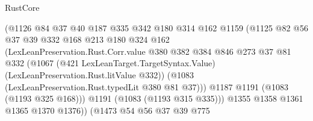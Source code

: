 \begin{lexlean}{RustCore}
\begin{coremodule}
{\begin{coremodule}
{{{{{                                      (@1126
                                        @84
                                        @37
                                        @40
                                        @187
                                        @335
                                        @342
                                        @180
                                        @314
                                        @162
                                        @1159
                                        (@1125
                                          @82
                                          @56
                                          @37
                                          @39
                                          @332
                                          @168
                                          @213
                                          @180
                                          @324
                                          @162
                                          (LexLeanPreservation.Rust.Corr.value
                                            @380
                                            @382
                                            @384
                                            @846
                                            @273
                                            @37
                                            @81
                                            @332
                                            (@1067
                                              (@421 LexLeanTarget.TargetSyntax.Value)
                                              (LexLeanPreservation.Rust.litValue @332))
                                            (@1083
                                              (LexLeanPreservation.Rust.typedLit @380 @81 @37)))
                                          @1187
                                          @1191
                                          (@1083 (@1193 @325 @168)))
                                        @1191
                                        (@1083 (@1193 @315 @335)))
                                      @1355
                                      @1358
                                      @1361
                                      @1365
                                      @1370
                                      @1376))
                                  (@1473
                                    @54
                                    @56
                                    @37
                                    @39
                                    @775
}}}}}
\end{coremodule}}
\end{coremodule}
\end{lexlean}
